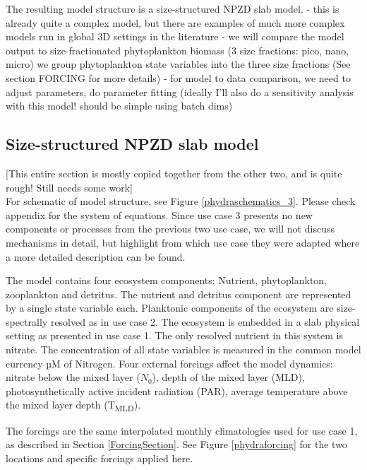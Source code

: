 \documentclass[template.tex]{subfiles}
\begin{document}
The resulting model structure is a size-structured NPZD slab model.
- this is already quite a complex model, but there are examples of much more complex models run in global 3D settings in the literature \citep{Ward2012}
- we will compare the model output to size-fractionated phytoplankton biomass (3 size fractions: pico, nano, micro) we group phytoplankton state variables into the three size fractions (See section FORCING for more details)
- for model to data comparison, we need to adjust parameters, do parameter fitting (ideally I'll also do a sensitivity analysis with this model! should be simple using batch dims)

\subsection{Size-structured NPZD slab model}

[This entire section is mostly copied together from the other two, and is quite rough! Still needs some work]\\

For schematic of model structure, see Figure \ref{phydraschematics_3}. Please check appendix for the system of equations. 
Since use case 3 presents no new components or processes from the previous two use case, we will not discuss mechanisms in detail, but highlight from which use case they were adapted where a more detailed description can be found. 

The model contains four ecosystem components: Nutrient, phytoplankton, zooplankton and detritus. The nutrient and detritus component are represented by a single state variable each. Planktonic components of the ecosystem are size-spectrally resolved as in use case 2.
The ecosystem is embedded in a slab physical setting as presented in use case 1. The only resolved nutrient in this system is nitrate. The concentration of all state variables is measured in the common model currency \unit{µM} of Nitrogen. Four external forcings affect the model dynamics: nitrate below the mixed layer ($N_0$), depth of the mixed layer (MLD), photosynthetically active incident radiation (PAR), average temperature above the mixed layer depth (\unit{T_{MLD}}). 

The forcings are the same interpolated monthly climatologies used for use case 1, as described in Section \ref{ForcingSection}. See Figure \ref{phydraforcing} for the two locations and specific forcings applied here.\\
\end{document}
